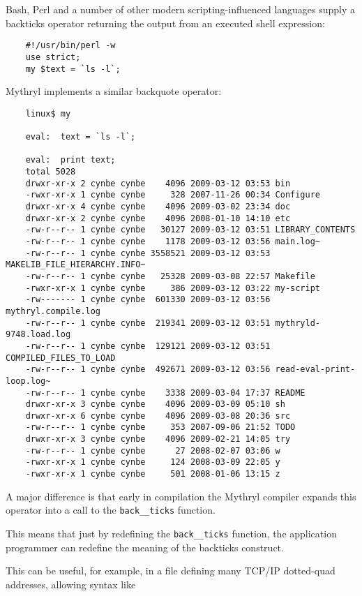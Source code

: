 Bash, Perl and a number of other modern scripting-influenced languages 
supply a backticks operator returning the output from an executed 
shell expression:

\begin{verbatim}
    #!/usr/bin/perl -w
    use strict;
    my $text = `ls -l`;
\end{verbatim}

Mythryl implements a similar backquote operator:

\begin{verbatim}
    linux$ my

    eval:  text = `ls -l`;

    eval:  print text;
    total 5028
    drwxr-xr-x 2 cynbe cynbe    4096 2009-03-12 03:53 bin
    -rwxr-xr-x 1 cynbe cynbe     328 2007-11-26 00:34 Configure
    drwxr-xr-x 4 cynbe cynbe    4096 2009-03-02 23:34 doc
    drwxr-xr-x 2 cynbe cynbe    4096 2008-01-10 14:10 etc
    -rw-r--r-- 1 cynbe cynbe   30127 2009-03-12 03:51 LIBRARY_CONTENTS
    -rw-r--r-- 1 cynbe cynbe    1178 2009-03-12 03:56 main.log~
    -rw-r--r-- 1 cynbe cynbe 3558521 2009-03-12 03:53 MAKELIB_FILE_HIERARCHY.INFO~
    -rw-r--r-- 1 cynbe cynbe   25328 2009-03-08 22:57 Makefile
    -rwxr-xr-x 1 cynbe cynbe     386 2009-03-12 03:22 my-script
    -rw------- 1 cynbe cynbe  601330 2009-03-12 03:56 mythryl.compile.log
    -rw-r--r-- 1 cynbe cynbe  219341 2009-03-12 03:51 mythryld-9748.load.log
    -rw-r--r-- 1 cynbe cynbe  129121 2009-03-12 03:51 COMPILED_FILES_TO_LOAD
    -rw-r--r-- 1 cynbe cynbe  492671 2009-03-12 03:56 read-eval-print-loop.log~
    -rw-r--r-- 1 cynbe cynbe    3338 2009-03-04 17:37 README
    drwxr-xr-x 3 cynbe cynbe    4096 2009-03-09 05:10 sh
    drwxr-xr-x 6 cynbe cynbe    4096 2009-03-08 20:36 src
    -rw-r--r-- 1 cynbe cynbe     353 2007-09-06 21:52 TODO
    drwxr-xr-x 3 cynbe cynbe    4096 2009-02-21 14:05 try
    -rw-r--r-- 1 cynbe cynbe      27 2008-02-07 03:06 w
    -rwxr-xr-x 1 cynbe cynbe     124 2008-03-09 22:05 y
    -rwxr-xr-x 1 cynbe cynbe     501 2008-01-06 13:15 z
\end{verbatim}


A major difference is that early in compilation the Mythryl compiler 
expands this operator into a call to the {\tt back\_\_ticks} function.

This means that just by redefining the {\tt back\_\_ticks} function, the 
application programmer can redefine the meaning of the backticks 
construct.

This can be useful, for example, in a file defining many TCP/IP 
dotted-quad addresses, allowing syntax like

